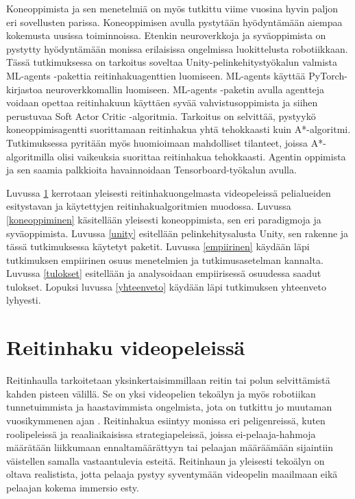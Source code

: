 \documentclass[utf8]{gradu3}
\begin{document}
Koneoppimista ja sen menetelmiä on myös tutkittu viime vuosina hyvin paljon eri sovellusten parissa. Koneoppimisen avulla pystytään hyödyntämään aiempaa kokemusta uusissa toiminnoissa. Etenkin neuroverkkoja ja syväoppimista on pystytty hyödyntämään monissa erilaisissa ongelmissa luokittelusta robotiikkaan. Tässä tutkimuksessa on tarkoitus soveltaa Unity-pelinkehitystyökalun valmista ML-agents -pakettia reitinhakuagenttien luomiseen. ML-agents käyttää PyTorch-kirjastoa neuroverkkomallin luomiseen. ML-agents -paketin avulla agentteja voidaan opettaa reitinhakuun käyttäen syvää vahvistusoppimista ja siihen perustuvaa Soft Actor Critic -algoritmia. Tarkoitus on selvittää, pystyykö koneoppimisagentti suorittamaan reitinhakua yhtä tehokkaasti kuin A*-algoritmi. Tutkimuksessa pyritään myös huomioimaan mahdolliset tilanteet, joissa A*-algoritmilla olisi vaikeuksia suorittaa reitinhakua tehokkaasti. Agentin oppimista ja sen saamia palkkioita havainnoidaan Tensorboard-työkalun avulla.

Luvussa \ref{reitinhakupeleis} kerrotaan yleisesti reitinhakuongelmasta videopeleissä pelialueiden esitystavan ja käytettyjen reitinhakualgoritmien muodossa. Luvussa \ref{koneoppiminen} käsitellään yleisesti koneoppimista, sen eri paradigmoja ja syväoppimista. Luvussa \ref{unity} esitellään pelinkehitysalusta Unity, sen rakenne ja tässä tutkimuksessa käytetyt paketit. Luvussa \ref{empiirinen} käydään läpi tutkimuksen empiirinen osuus menetelmien ja tutkimusasetelman kannalta. Luvussa \ref{tulokset} esitellään ja analysoidaan empiirisessä osuudessa saadut tulokset. Lopuksi luvussa \ref{yhteenveto} käydään läpi tutkimuksen yhteenveto lyhyesti.

\chapter{Reitinhaku videopeleissä}
\label{reitinhakupeleis}

Reitinhaulla tarkoitetaan yksinkertaisimmillaan reitin tai polun selvittämistä kahden pisteen välillä. Se on yksi videopelien tekoälyn ja myös robotiikan tunnetuimmista ja haastavimmista ongelmista, jota on tutkittu jo muutaman vuosikymmenen ajan \parencite{abd2015comprehensive,cui2011based}. Reitinhakua esiintyy monissa eri peligenreissä, kuten roolipeleissä ja reaaliaikaisissa strategiapeleissä, joissa ei-pelaaja-hahmoja määrätään liikkumaan ennaltamäärättyyn tai pelaajan määräämään sijaintiin väistellen samalla vastaantulevia esteitä. Reitinhaun ja yleisesti tekoälyn on oltava realistista, jotta pelaaja pystyy syventymään videopelin maailmaan eikä pelaajan kokema immersio esty.
\end{document}
